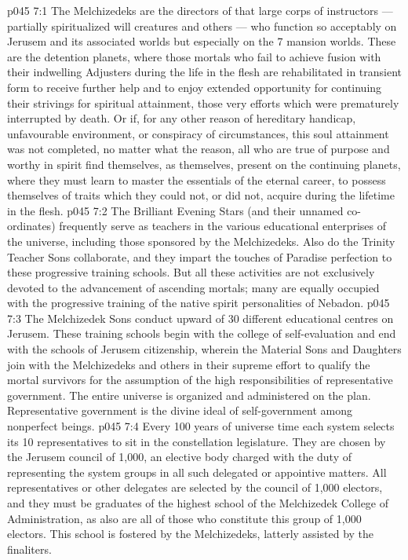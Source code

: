 \vs p045 7:1 The Melchizedeks are the directors of that large corps of instructors --- partially spiritualized will creatures and others --- who function so acceptably on Jerusem and its associated worlds but especially on the 7 mansion worlds. These are the detention planets, where those mortals who fail to achieve fusion with their indwelling Adjusters during the life in the flesh are rehabilitated in transient form to receive further help and to enjoy extended opportunity for continuing their strivings for spiritual attainment, those very efforts which were prematurely interrupted by death. Or if, for any other reason of hereditary handicap, unfavourable environment, or conspiracy of circumstances, this soul attainment was not completed, no matter what the reason, all who are true of purpose and worthy in spirit find themselves, as themselves, present on the continuing planets, where they must learn to master the essentials of the eternal career, to possess themselves of traits which they could not, or did not, acquire during the lifetime in the flesh.
\vs p045 7:2 The Brilliant Evening Stars (and their unnamed co\hyp{}ordinates) frequently serve as teachers in the various educational enterprises of the universe, including those sponsored by the Melchizedeks. Also do the Trinity Teacher Sons collaborate, and they impart the touches of Paradise perfection to these progressive training schools. But all these activities are not exclusively devoted to the advancement of ascending mortals; many are equally occupied with the progressive training of the native spirit personalities of Nebadon.
\vs p045 7:3 The Melchizedek Sons conduct upward of 30 different educational centres on Jerusem. These training schools begin with the college of self\hyp{}evaluation and end with the schools of Jerusem citizenship, wherein the Material Sons and Daughters join with the Melchizedeks and others in their supreme effort to qualify the mortal survivors for the assumption of the high responsibilities of representative government. The entire universe is organized and administered on the  plan. Representative government is the divine ideal of self\hyp{}government among nonperfect beings.
\vs p045 7:4 Every 100 years of universe time each system selects its 10 representatives to sit in the constellation legislature. They are chosen by the Jerusem council of 1,000, an elective body charged with the duty of representing the system groups in all such delegated or appointive matters. All representatives or other delegates are selected by the council of 1,000 electors, and they must be graduates of the highest school of the Melchizedek College of Administration, as also are all of those who constitute this group of 1,000 electors. This school is fostered by the Melchizedeks, latterly assisted by the finaliters.
